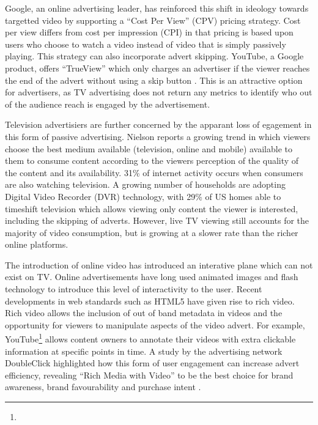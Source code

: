 	Google, an online advertising leader, has reinforced this shift in ideology towards targetted video by supporting a ``Cost Per View'' (CPV) pricing strategy. Cost per view differs from cost per impression (CPI) in that pricing is based upon users who choose to watch a video instead of video that is simply passively playing. This strategy can also incorporate advert skipping. YouTube, a Google product, offers ``TrueView'' which only charges an advertiser if the viewer reaches the end of the advert without using a skip button \citep{trueview}. This is an attractive option for advertisers, as TV advertising does not return any metrics to identify who out of the audience reach is engaged by the advertisement.

	Television advertisiers are further concerned by the apparant loss of egagement in this form of passive advertising. Nielson reports a growing trend in which viewers choose the best medium available (television, online and mobile) available to them to consume content according to the viewers perception of the quality of the content and its availability. 31\% of internet activity occurs when consumers are also watching television. A growing number of households are adopting Digital Video Recorder (DVR) technology, with 29\% of US homes able to timeshift television which allows viewing only content the viewer is interested, including the skipping of adverts. However, live TV viewing still accounts for the majority of video consumption, but is growing at a slower rate than the richer online platforms. \citep{three-screen}

	The introduction of online video has introduced an interative plane which can not exist on TV. Online advertisements have long used animated images and flash technology to introduce this level of interactivity to the user. Recent developments in web standards such as HTML5 have given rise to rich video. Rich video allows the inclusion of out of band metadata in videos and the opportunity for viewers to manipulate aspects of the video advert. For example, YouTube\footnote{} allows content owners to annotate their videos with extra clickable information at specific points in time. A study by the advertising network DoubleClick highlighted how this form of user engagement can increase advert efficiency, revealing ``Rich Media with Video'' to be the best choice for brand awareness, brand favourability and purchase intent \citep{rich-video}.


